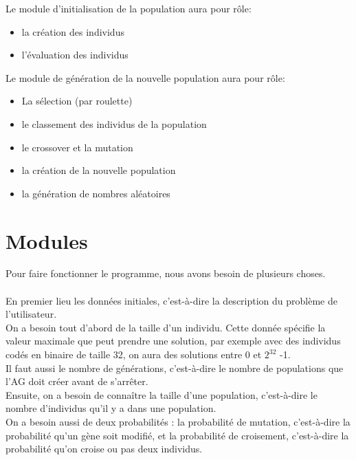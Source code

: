 \documentclass[a4paper,11pt]{article}
\begin{document}
		Le module d’initialisation de la population aura pour rôle:
		\begin{itemize}
				\item la création des individus
				\item l’évaluation des individus\\
		\end{itemize}
		Le module de génération de la nouvelle population aura pour rôle:
		\begin{itemize}
				\item La sélection (par roulette)
				\item le classement des individus de la population
				\item le crossover et la mutation
				\item la création de la nouvelle population
				\item la génération de nombres aléatoires\\
		\end{itemize}
		

	\section{Modules}
		Pour faire fonctionner le programme, nous avons besoin de plusieurs choses.\\
		\\

		En premier lieu les données initiales, c'est-à-dire la description du problème de l'utilisateur.\\
		On a besoin tout d’abord de la taille d’un individu. 
		Cette donnée spécifie la valeur maximale que peut prendre une solution, par exemple avec des individus codés en binaire de taille 32, on aura des solutions entre 0 et $2^{32}$ -1.\\
		Il faut aussi le nombre de générations, c’est-à-dire le nombre de populations que l’AG doit créer avant de s’arrêter.\\

		Ensuite, on a besoin de connaître la taille d’une population, c’est-à-dire le nombre d’individus qu’il y a dans une population.\\
		On a besoin aussi de deux probabilités : la probabilité de mutation, c’est-à-dire la probabilité qu’un gène soit modifié, et la probabilité de croisement, c’est-à-dire la probabilité qu’on croise ou pas deux individus. 
		
\end{document}
